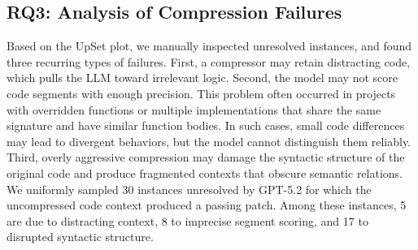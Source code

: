 \documentclass[sigconf,nonacm]{acmart}
\newcommand{\haoxiang}[1]{{\color{red}\textbf{(Haoxiang:} #1\textbf{)}}}
\newcommand{\projName}{\textsc{SWEzze}\xspace}
\begin{document}
\subsection{RQ3: Analysis of Compression Failures}



Based on the UpSet plot, we manually inspected unresolved instances, and found three recurring types of failures. First, a compressor may retain distracting code, which pulls the LLM toward irrelevant logic. Second, the model may not score code segments with enough precision. This problem often occurred in projects with overridden functions or multiple implementations that share the same signature and have similar function bodies. In such cases, small code differences may lead to divergent behaviors, but the model cannot distinguish them reliably. Third, overly aggressive compression may damage the syntactic structure of the original code and produce fragmented contexts that obscure semantic relations. We uniformly sampled 30 instances unresolved by GPT-5.2 for which the uncompressed code context produced a passing patch. Among these instances, 5 are due to distracting context, 8 to imprecise segment scoring, and 17 to disrupted syntactic structure.
\end{document}
